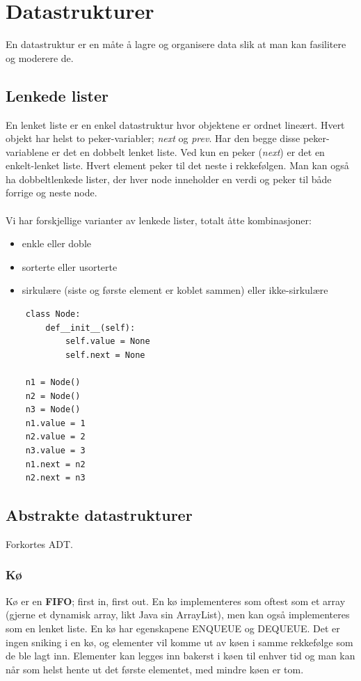 \section{Datastrukturer}
En datastruktur er en måte å lagre og organisere data slik at man kan fasilitere og moderere de.

\subsection{Lenkede lister}
En lenket liste er en enkel datastruktur hvor objektene er ordnet lineært. Hvert objekt har helst to peker-variabler; \textit{next} og \textit{prev}. Har den begge disse peker-variablene er det en dobbelt lenket liste. Ved kun en peker (\textit{next}) er det en enkelt-lenket liste. Hvert element peker til det neste i rekkefølgen. Man kan også ha dobbeltlenkede lister, der hver node inneholder en verdi og peker til både forrige og neste node.
\\\\
Vi har forskjellige varianter av lenkede lister, totalt åtte kombinasjoner:
\begin{itemize}
    \item enkle eller doble
    \item sorterte eller usorterte
    \item sirkulære (siste og første element er koblet sammen) eller ikke-sirkulære
\end{itemize}

\begin{lstlisting}
    class Node:
    	def__init__(self):
    		self.value = None
    		self.next = None
    
    n1 = Node()
    n2 = Node()
    n3 = Node()
    n1.value = 1
    n2.value = 2
    n3.value = 3
    n1.next = n2
    n2.next = n3
\end{lstlisting}

\subsection{Abstrakte datastrukturer}
Forkortes ADT.

\subsubsection{Kø}
Kø er en \textbf{FIFO}; first in, first out. En kø implementeres som oftest som et array (gjerne et dynamisk array, likt Java sin ArrayList), men kan også implementeres som en lenket liste. En kø har egenskapene ENQUEUE og DEQUEUE. Det er ingen sniking i en kø, og elementer vil komme ut av køen i samme rekkefølge som de ble lagt inn. Elementer kan legges inn bakerst i køen til enhver tid og man kan når som helst hente ut det første elementet, med mindre køen er tom.


